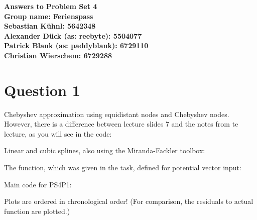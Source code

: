 \documentclass{article}
\begin{document}
	\begin{center}
		\LARGE \bfseries{Answers to Problem Set 4}\\
		Group name: Ferienspass\vspace{.5cm}\\
		\normalsize \normalfont
		Sebastian K\"uhnl: 5642348\\
		Alexander D\"uck (as: reebyte): 5504077\\
		Patrick Blank (as: paddyblank): 6729110\\
		Christian Wierschem: 6729288
	\end{center}
	\normalsize	
	\section{Question 1}
	Chebyshev approximation using equidistant nodes and Chebyshev nodes. However, there is a difference between lecture slides 7 and the notes from te lecture, as you will see in the code: 
	
	Linear and cubic splines, also using the Miranda-Fackler toolbox:
	
	The function, which was given in the task, defined for potential vector input:
	
	Main code for PS4P1:
	
	Plots are ordered in chronological order! (For comparison, the residuals to actual function are plotted.)\\
\end{document}
